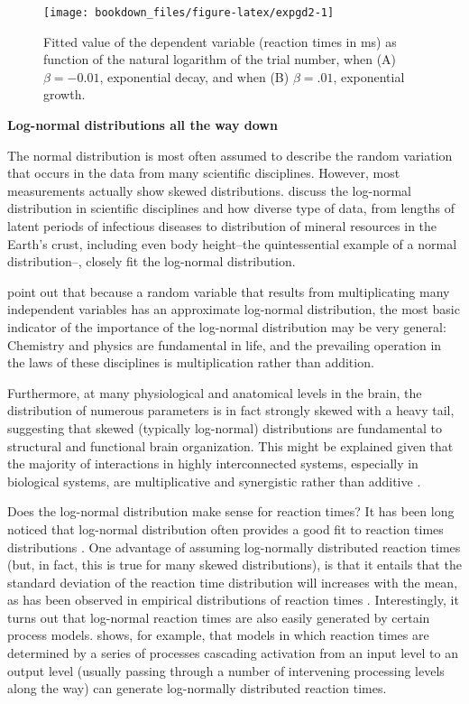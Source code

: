 \documentclass[12pt,]{krantz}
\theoremstyle{definition}
\theoremstyle{definition}
\theoremstyle{definition}
\theoremstyle{remark}
\begin{document}
\begin{figure}[H]
\texttt{[image: bookdown\_files/figure-latex/expgd2-1]} \caption{Fitted value of the dependent variable (reaction times in ms) as function of the natural logarithm of the trial number, when (A) \(\beta=-0.01\), exponential decay, and when (B) \(\beta =.01\), exponential growth.}\label{fig:expgd2}
\end{figure}

\textbf{Log-normal distributions all the way down}

The normal distribution is most often assumed to describe the random variation that occurs in the data from many scientific disciplines. However, most measurements actually show skewed distributions. \citet{limpertLognormalDistributionsSciences2001} discuss the log-normal distribution in scientific disciplines and how diverse type of data, from lengths of latent periods of infectious diseases to distribution of mineral resources in the Earth's crust, including even body height--the quintessential example of a normal distribution--, closely fit the log-normal distribution.

\citet{limpertLognormalDistributionsSciences2001} point out that because a random variable that results from multiplicating many independent variables has an approximate log-normal distribution, the most basic indicator of the importance of the log-normal distribution may be very general: Chemistry and physics are fundamental in life, and the prevailing operation in the laws of these disciplines is multiplication rather than addition.

Furthermore, at many physiological and anatomical levels in the brain, the distribution of numerous parameters is in fact strongly skewed with a heavy tail, suggesting that skewed (typically log-normal) distributions are fundamental to structural and functional brain organization. This might be explained given that the majority of interactions in highly interconnected systems, especially in biological systems, are multiplicative and synergistic rather than additive \citep{buzsakiLogdynamicBrainHow2014}.

Does the log-normal distribution make sense for reaction times?
It has been long noticed that log-normal distribution often provides a good fit to reaction times
distributions \citep{ref}.
One advantage of assuming log-normally distributed reaction times (but, in fact, this is true for many skewed distributions), is that it entails that the standard deviation of the reaction time distribution will increases with the mean, as has been observed in empirical distributions of reaction times \citep{wagenmakersRelationMeanVariance2005}. Interestingly, it turns out that log-normal reaction times are also easily generated by certain process models. \citet{ulrichInformationProcessingModels1993} shows, for example, that models in which reaction times are determined by a series of processes cascading activation from an input level to an output level (usually passing through a number of intervening processing levels along the way) can generate log-normally distributed reaction times.
\end{document}

